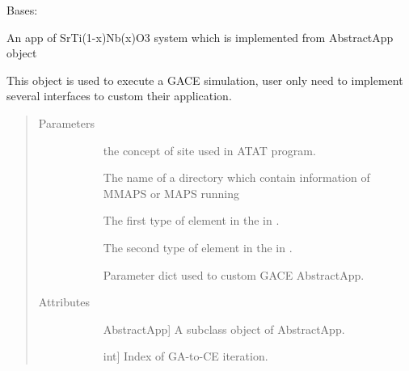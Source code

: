 \documentclass[letterpaper,10pt,english]{sphinxmanual}
\begin{document}
\begin{fulllineitems}
\label{\detokenize{pygace.examples.sto:pygace.examples.sto.sto_gace.STOApp}}
Bases: {\hyperref[\detokenize{pygace:pygace.gace.AbstractApp}]{}}

An app of SrTi(1-x)Nb(x)O3 system which is implemented from AbstractApp
object

This object is used to execute a GACE simulation, user only need to
implement several interfaces to custom their application.
\begin{quote}\begin{description}
\item[{Parameters}] \leavevmode\begin{description}
\item[{}] \leavevmode
the concept of site used in ATAT program.

\item[{}] \leavevmode
The name of a directory which contain information of MMAPS or MAPS
running

\item[{}] \leavevmode
The first type of element in the  in .

\item[{}] \leavevmode
The second type of element in the  in .

\item[{}] \leavevmode
Parameter dict used to custom GACE AbstractApp.

\end{description}

\item[{Attributes}] \leavevmode\begin{description}
\item[{}] \leavevmode{[}AbstractApp{]}
A subclass object of AbstractApp.

\item[{}] \leavevmode{[}int{]}
Index of GA-to-CE iteration.


\end{description}
\end{description}
\end{quote}
\end{fulllineitems}
\end{document}
